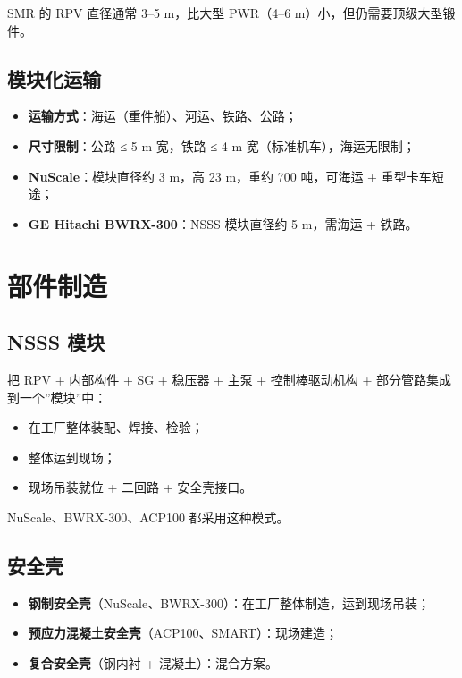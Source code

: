 \documentclass[
  UTF8,
  scheme=plain,
  fontsize=10pt,
  openany
]{ctexbook}
\begin{document}
SMR 的 RPV 直径通常 3--5 m，比大型 PWR（4--6
m）小，但仍需要顶级大型锻件。

\subsection{模块化运输}\label{ux6a21ux5757ux5316ux8fd0ux8f93}

\begin{itemize}
\tightlist
\item
  \textbf{运输方式}：海运（重件船）、河运、铁路、公路；
\item
  \textbf{尺寸限制}：公路 ≤ 5 m 宽，铁路 ≤ 4 m
  宽（标准机车），海运无限制；
\item
  \textbf{NuScale}：模块直径约 3 m，高 23 m，重约 700 吨，可海运 +
  重型卡车短途；
\item
  \textbf{GE Hitachi BWRX-300}：NSSS 模块直径约 5 m，需海运 + 铁路。
\end{itemize}

\section{部件制造}\label{ux90e8ux4ef6ux5236ux9020}

\subsection{NSSS 模块}\label{nsss-ux6a21ux5757}

把 RPV + 内部构件 + SG + 稳压器 + 主泵 + 控制棒驱动机构 +
部分管路集成到一个''模块''中：

\begin{itemize}
\tightlist
\item
  在工厂整体装配、焊接、检验；
\item
  整体运到现场；
\item
  现场吊装就位 + 二回路 + 安全壳接口。
\end{itemize}

NuScale、BWRX-300、ACP100 都采用这种模式。

\subsection{安全壳}\label{ux5b89ux5168ux58f3}

\begin{itemize}
\tightlist
\item
  \textbf{钢制安全壳}（NuScale、BWRX-300）：在工厂整体制造，运到现场吊装；
\item
  \textbf{预应力混凝土安全壳}（ACP100、SMART）：现场建造；
\item
  \textbf{复合安全壳}（钢内衬 + 混凝土）：混合方案。
\end{itemize}
\end{document}
